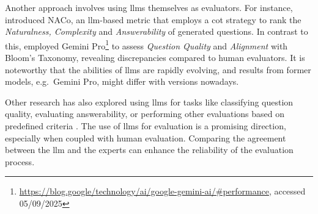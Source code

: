 
 Another approach involves using \ac{llms} themselves as evaluators. For instance, \cite{nguyen_reference-based_2024} introduced NACo, an \ac{llm}-based metric that employs a \ac{cot} strategy to rank the \textit{Naturalness, Complexity} and \textit{Answerability} of generated questions. In contrast to this, \cite{scaria_how_2024} employed Gemini Pro\footnote{\url{https://blog.google/technology/ai/google-gemini-ai/\#performance}, accessed 05/09/2025} to assess \textit{Question Quality} and \textit{Alignment} with Bloom's Taxonomy, revealing discrepancies compared to human evaluators. It is noteworthy that the abilities of \ac{llms} are rapidly evolving, and results from former models, e.g.\ Gemini Pro, might differ with versions nowadays. 

Other research has also explored using \ac{llms} for tasks like classifying question quality, evaluating answerability, or performing other evaluations based on predefined criteria \cite{moore_assessing_2022,scaria_how_2024,blobstein_angel_2023}. The use of \ac{llms} for evaluation is a promising direction, especially when coupled with human evaluation. Comparing the agreement between the \ac{llm} and the experts can enhance the reliability of the evaluation process.
